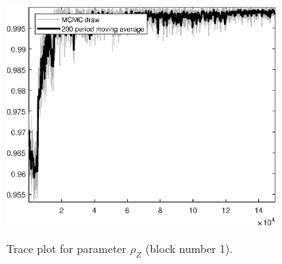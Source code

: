 \begin{figure}[H]
\centering
  \includegraphics[width=0.8\textwidth]{BRS_sectoral_wo_gmf/graphs/TracePlot_rho_Z_blck_1}\\
    \caption{Trace plot for parameter ${\rho_Z}$ (block number 1).}
\end{figure}
